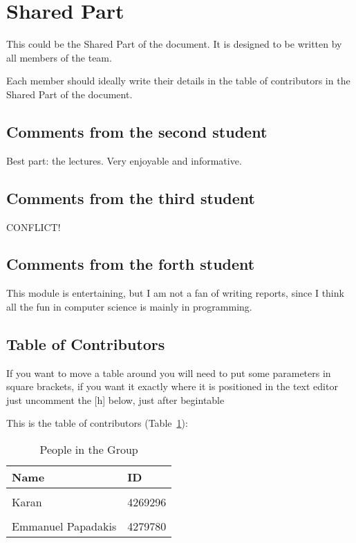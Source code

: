 \section{Shared Part}

This could be the Shared Part of the document. It is designed to be written by all members of the team.

Each member should ideally write their details in the table of contributors in the Shared Part of the document.



\subsection{Comments from the second student}
Best part: the lectures. Very enjoyable and informative. 
\subsection{Comments from the third student}
CONFLICT!

\subsection{Comments from the forth student}
This module is entertaining, but I am not a fan of writing reports, since I think all the fun in computer science is mainly in programming.

\subsection{Table of Contributors}


If you want to move a table around you will need to put some parameters in square brackets, if you want it exactly where it is positioned in the text editor just uncomment the [h] below, just after begin{table}

This is the table of contributors (Table~\ref{authors}):
\begin{table}%
\centering
\caption{People in the Group}
\label{authors}
\begin{tabular}{|l|l|}
\hline
\textbf{Name} & \textbf{ID} \\
\hline
& \\
\hline
Karan&4269296 \\
\hline
& \\
\hline
Emmanuel Papadakis & 4279780 \\
\hline
\end{tabular}
\end{table}